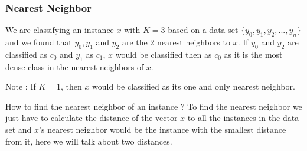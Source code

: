 \documentclass{beamer}
\begin{document}
\begin{frame}
\frametitle{Nearest Neighbor}
\begin{example}

We are classifying an instance $ x $ with $ K = 3 $ based on a data set $ \{y_0,y_1,y_2,...,y_n\} $ and we found that $ y_0, y_1 $ and $ y_2 $ are the 2 nearest neighbors to $ x $. If $ y_0 $ and $ y_2 $ are classified as $ c_0 $ and $ y_1 $ as $ c_1 $, $ x  $ would be classified then as $ c_0 $ as it is the most dense class in the nearest neighbors of $ x $.

\end{example}
\begin{alertblock}{Note :}
If $ K = 1 $, then $ x $ would be classified as its one and only nearest neighbor.
\end{alertblock}
\begin{block}{How to find the nearest neighbor of an instance ?}
To find the nearest neighbor we just have to calculate the distance of the vector $ x $ to all the instances in the data set and $ x $'s nearest neighbor would be the instance with the smallest distance from it, here we will talk about two distances.
\end{block}
\end{frame}
\end{document}
